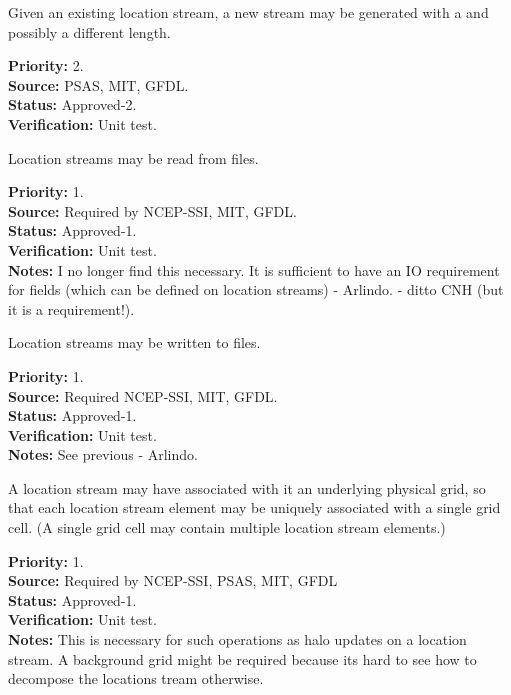 Given an existing location stream, a new stream may be generated with a and
possibly a different length.
\begin{reqlist}
{\bf Priority:} 2. \\
{\bf Source:} PSAS, MIT, GFDL.\\
{\bf Status:} Approved-2. \\
{\bf Verification:} Unit test.
\end{reqlist}

Location streams may be read from files.
\begin{reqlist}
{\bf Priority:} 1. \\
{\bf Source:} Required by NCEP-SSI, MIT, GFDL. \\
{\bf Status:} Approved-1. \\
{\bf Verification:} Unit test. \\
{\bf Notes:} I no longer find this necessary. It is sufficient to have an IO requirement for fields (which can be defined on location streams) - Arlindo. - ditto CNH (but it is a requirement!).
\end{reqlist}

Location streams may be written to files.
\begin{reqlist}
{\bf Priority:} 1. \\
{\bf Source:} Required NCEP-SSI, MIT, GFDL. \\
{\bf Status:} Approved-1. \\
{\bf Verification:} Unit test. \\
{\bf Notes:} See previous - Arlindo.
\end{reqlist}

A location stream may have associated with it an underlying physical grid, so that each
location stream element may be uniquely associated with a single grid cell. (A single
grid cell may contain multiple location stream elements.)
\begin{reqlist}
{\bf Priority:} 1. \\
{\bf Source:} Required by NCEP-SSI, PSAS, MIT, GFDL \\
{\bf Status:} Approved-1. \\
{\bf Verification:} Unit test. \\
{\bf Notes:} This is necessary for such operations as halo updates on a location
stream. A background grid might be required because its hard to see how to
decompose the locations tream otherwise.
\end{reqlist}

